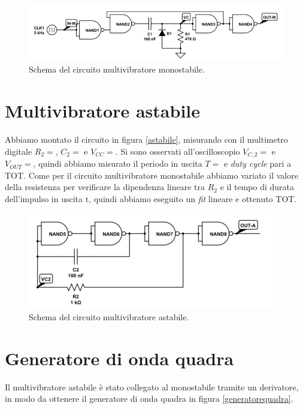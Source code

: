 \documentclass[10pt,a4paper]{article}
\begin{document}

\begin{figure}[!htb]
  \centering
  \includegraphics[scale=0.5]{monostabile.png}
\caption{Schema del circuito multivibratore monostabile.\label{monostabile}}
\label{pin}
\end{figure}


\section{Multivibratore astabile}
Abbiamo montato il circuito in figura \ref{astabile}, misurando con il multimetro digitale $R_2= $, $C_2= $ e $V_{CC}= $. Si sono osservati all'oscilloscopio $V_{C,2}= $ e $V_{OUT}= $, quindi abbiamo misurato il periodo in uscita $T= $ e \emph{duty cycle} pari a TOT.
Come per il circuito multivibratore monostabile abbiamo variato il valore della resistenza per verificare la dipendenza lineare tra $R_2$ e il tempo di durata dell'impulso in uscita t, quindi abbiamo eseguito un \emph{fit} lineare e ottenuto TOT.

\begin{figure}[!htb]
  \centering
  \includegraphics[scale=0.5]{astabile.png}
\caption{Schema del circuito multivibratore astabile.\label{astabile}}
\label{pin}
\end{figure}

\section{Generatore di onda quadra}
Il multivibratore astabile è stato collegato al monostabile tramite un derivatore, in modo da ottenere il generatore di onda quadra in figura \ref{generatorequadra}. 
\end{document}
